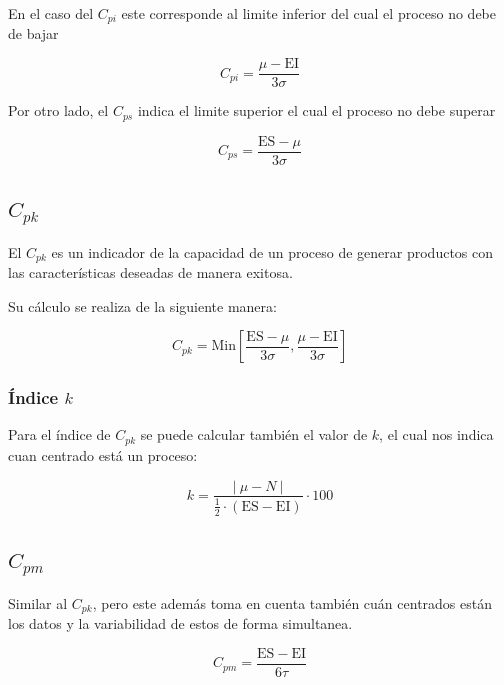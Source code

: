 En el caso del $C_{pi}$ este corresponde al limite inferior del cual el proceso no debe de bajar

\begin{equation}
    C_{pi} = \frac{\mu-\mathrm{EI}}{3\sigma}
\end{equation}

Por otro lado, el $C_{ps}$ indica el limite superior el cual el proceso no debe superar

\begin{equation}
    C_{ps} = \frac{\mathrm{ES}-\mu}{3\sigma}
\end{equation}

\subsection{$C_{pk}$}

El $C_{pk}$ es un indicador de la capacidad de un proceso de generar productos con las características deseadas de manera exitosa.

Su cálculo se realiza de la siguiente manera:

\begin{equation}
    C_{pk} = \mathrm{Min}\left[\frac{\mathrm{ES}-\mu}{3\sigma},\frac{\mu-\mathrm{EI}}{3\sigma}\right]
\end{equation}

\subsubsection{Índice $k$}

Para el índice de $C_{pk}$ se puede calcular también el valor de $k$, el cual nos indica cuan centrado está un proceso:

\begin{equation}
    k = \frac{\lvert\ \mu-N \ \rvert}{\frac{1}{2} \cdot (\mathrm{ES - EI})} \cdot 100
\end{equation}

\subsection{$C_{pm}$}

Similar al $C_{pk}$, pero este además toma en cuenta también cuán centrados están los datos y la variabilidad de estos de forma simultanea.

\begin{equation}
    C_{pm} = \frac{\mathrm{ES}-\mathrm{EI}}{6\tau}
\end{equation}


